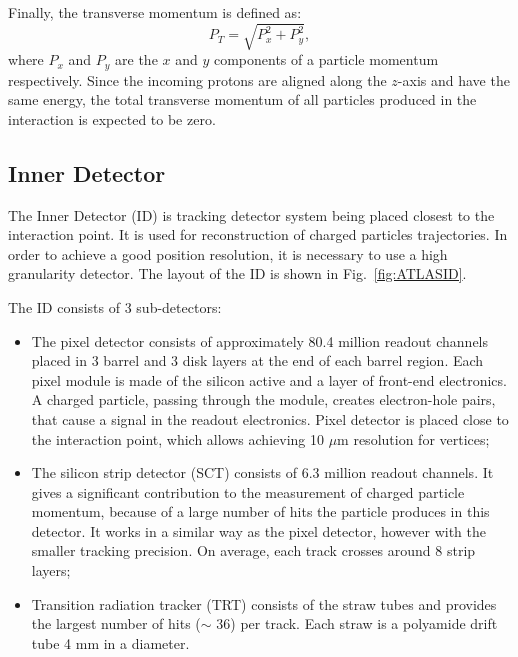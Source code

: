 Finally, the transverse momentum is defined as:
\begin{equation}
P_T=\sqrt{P_x^2+P_y^2},
\end{equation}
where $P_x$ and $P_y$ are the $x$ and $y$ components of a particle momentum respectively. Since the incoming protons are aligned along the $z$-axis and have the same energy, the total transverse momentum of all particles produced in the interaction is expected to be zero. 

\subsection{Inner Detector}

\begin{figure}[!tbp]
\end{figure}

The Inner Detector (ID) is tracking detector system being placed closest to the interaction point. It is used for reconstruction of charged particles trajectories. In order to achieve a good position resolution, it is necessary to use a high granularity detector. The layout of the ID is shown in Fig.~\ref{fig:ATLASID}. 

The ID consists of 3 sub-detectors:
\begin{itemize}
\item The pixel detector consists of approximately 80.4 million readout channels placed in 3 barrel and 3 disk layers at the end of each barrel region. Each pixel module is made of the silicon active and a layer of front-end electronics. A charged particle, passing through the module, creates electron-hole pairs, that cause a signal in the readout electronics. Pixel detector is placed close to the interaction point, which allows achieving 10 $\mu$m resolution for vertices;
\item The silicon strip detector (SCT) consists of 6.3 million readout channels. It gives a significant contribution to the measurement of charged particle momentum, because of a large number of hits the particle produces in this detector. It works in a similar way as the pixel detector, however  with the  smaller tracking precision. On average, each track crosses around 8 strip layers;
\item Transition radiation tracker (TRT) consists of the straw tubes and provides the largest number of hits ($\sim$ 36) per track. Each straw is a polyamide drift tube 4 mm in a diameter.
\end{itemize}


